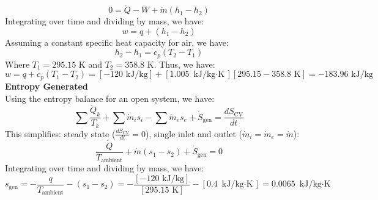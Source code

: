 \documentclass[12pt]{article}
\begin{document}
\[0 = \dot{Q} - \dot{W} + \dot{m}(h_1 - h_2)\]
Integrating over time and dividing by mass, we have:
\[w = q + (h_1 - h_2)\]
Assuming a constant specific heat capacity for air, we have:
\[h_2 - h_1 = c_p (T_2 - T_1)\]
Where $T_1 = 295.15$ K and $T_2 = 358.8$ K. Thus, we have:
\[w = q + c_p (T_1 - T_2) = [-120\text{ kJ/kg}]+[1.005\text{ kJ/kg$\cdot$K}][295.15 - 358.8\text{ K}] = \boxed{-183.96\text{ kJ/kg}}\]
\textbf{Entropy Generated}\\
Using the entropy balance for an open system, we have:
\[\sum \frac{\dot{Q}_k}{T_k} +\sum \dot{m}_i s_i - \sum \dot{m}_e s_e + \dot{S}_\text{gen} = \frac{dS_\text{CV}}{dt}\]
This simplifies: steady state ($\frac{dS_\text{CV}}{dt} = 0$), single inlet and outlet ($\dot{m}_i = \dot{m}_e = \dot{m}$):
\[\frac{\dot{Q}}{T_\text{ambient}} + \dot{m}(s_1 - s_2) + \dot{S}_\text{gen} = 0\]
Integrating over time and dividing by mass, we have:
\[s_\text{gen} = -\frac{q}{T_\text{ambient}} - (s_1 - s_2) = -\frac{[-120\text{ kJ/kg}]}{[295.15\text{ K}]} - [0.4\text{ kJ/kg$\cdot$K}] = \boxed{0.0065\text{ kJ/kg$\cdot$K}}\]
\newpage
\end{document}
